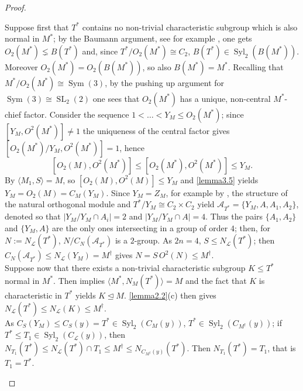 \documentclass{amsart}
\numberwithin{equation}{section}
\theoremstyle{definition}
\theoremstyle{subresult}
\theoremstyle{caseresult}
\renewcommand{\L}{\mathcal{L}}
\newcommand{\Syl}{\operatorname{Syl}}
\newcommand{\SL}{\operatorname{SL}}
\newcommand{\Sym}{\operatorname{Sym}}
\newcommand{\norm}{\trianglelefteq}
\newcommand{\<}{\langle}
\renewcommand{\>}{\rangle}
\begin{document}
\begin{proof}
\begin{itemize}
		Suppose first that $T^*$ contains no non-trivial characteristic subgroup which is also normal in $M^*$; by the Baumann argument, see for example \cite[Lemmas 2.8]{PPS:2003}, one gets $O_2(M^*) \lneq B(T^*)$ and, since $T^* / O_2(M^*) \cong C_2$, $B(T^*) \in \Syl_2(B(M^*))$. Moreover $O_2(M^*)= O_2(B(M^*))$, so also $B(M^*)=M^*$. Recalling that $M^*/O_2(M^*) \cong \Sym(3)$, by the pushing up argument for $\Sym(3) \cong \SL_2(2)$ one sees that $O_2(M^*)$ has a unique, non-central $M^*$-chief factor. Consider the sequence $1 < \dots < Y_M \le O_2(M^*)$; since $[Y_M,O^2(M^*)] \ne 1$ the uniqueness of the central factor gives $[O_2(M^*)/Y_M , O^2(M^*)] =1$, hence
		\[
		[O_2(M),O^2(M^*)] \le [O_2(M^*),O^2(M^*)] \le Y_M.
		\]
		By \cite[Lemma 3.4(h)]{Meier-Stell-Stroth:2012} $\<M_1,S \> =M$, so $[O_2(M),O^2(M)] \le Y_M$ and \ref{lemma3.5} yields $Y_M=O_2(M)=C_M(Y_M)$.	Since $Y_M = Z_M$, for example by \cite[Lemma 3.3(f)]{Meier-Stell-Stroth:2012}, the structure of the natural orthogonal module and $T^*/Y_M \cong C_2 \times C_2$ yield $\mathcal{A}_{T^*} = \{Y_M,A,A_1,A_2\}$, denoted so that $|Y_M / Y_M \cap A_i|=2$ and $|Y_M / Y_M \cap A|=4$. Thus the pairs $\{A_1,A_2\}$ and $\{Y_M,A\}$ are the only ones intersecting in a group of order $4$; then, for $N:= N_\L(T^*)$, $N/C_N(\mathcal{A}_{T^*})$ is a $2$-group. As $2n=4$, $S \le N_\L(T^*)$; then $C_N(\mathcal{A}_{T^*}) \le N_\L(Y_M)=M^\dagger$ gives $N = S \, O^2(N) \le M^\dagger$.\\
		
		Suppose now that there exists a non-trivial characteristic subgroup $K \le T^*$ normal in $M^*$. Then \cite[Lemma 3.4(h)]{Meier-Stell-Stroth:2012} implies $\<M^*,N_M(T^*)\>=M$ and the fact that $K$ is characteristic in $T^*$ yields $K \norm M$. \ref{lemma2.2}(c) then gives $N_\L(T^*) \le N_\L(K) \le M^\dagger$.\\
		
		As $C_S(Y_M) \le C_S(y)=T^* \in \Syl_2(C_M(y))$, $T^* \in \Syl_2(C_{M^\dagger}(y))$; if $T^* \le T_1 \in \Syl_2(C_\L(y))$, then $N_{T_1}(T^*) \le N_\L(T^*) \cap T_1 \le M^\dagger \le N_{C_{M^\dagger}(y)}(T^*)$. Then $N_{T_1}(T^*)=T_1$, that is $T_1=T^*$.
		

\end{itemize}
\end{proof}
\end{document}

